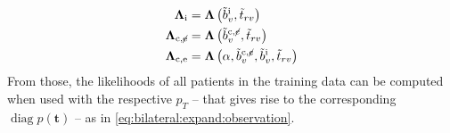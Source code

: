\documentclass[\relativeRoot/main.tex]{subfiles}
\begin{document}
%
\begin{equation}
    \begin{aligned}
        \boldsymbol{\Lambda}_\text{i} &= \boldsymbol{\Lambda} \left( \tilde{b}_v^\text{i} , \tilde{t}_{rv} \right) \\
        \boldsymbol{\Lambda}_{\text{c} , \centernot{\text{e}}} &= \boldsymbol{\Lambda}\left( \tilde{b}_v^{\text{c} , \centernot{e}} , \tilde{t}_{rv} \right) \\
        \boldsymbol{\Lambda}_{\text{c} , \text{e}} &= \boldsymbol{\Lambda} \left( \alpha , \tilde{b}_v^{\text{c} , \centernot{e}} , \tilde{b}_v^\text{i} , \tilde{t}_{rv} \right)
    \end{aligned}
\end{equation}
%
From those, the likelihoods of all patients in the training data can be computed when used with the respective $p_T$ -- that gives rise to the corresponding $\operatorname{diag}{p(\mathbf{t})}$ -- as in \cref{eq:bilateral:expand:observation}.
\end{document}
